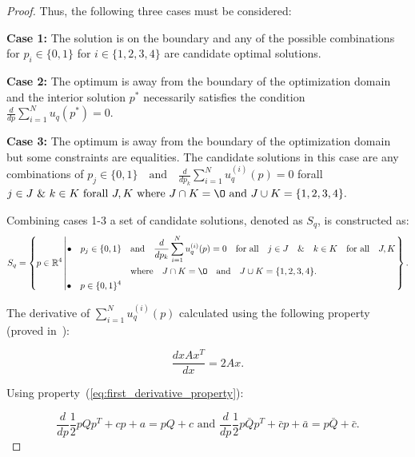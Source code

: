 \documentclass[10pt]{article}
\begin{document}
\begin{proof}
    Thus, the following three cases must be considered:
    
    \textbf{Case 1:} The solution is on the boundary and any of the possible
    combinations for $p_i \in \{0, 1\}$ for $i \in \{1, 2, 3, 4\}$ are candidate
    optimal solutions.
    
    \textbf{Case 2:} The optimum is away from the boundary of the optimization
    domain and the interior solution $p^*$ necessarily satisfies the condition
    \(\frac{d}{dp} \sum\limits_{i=1} ^ N  u_q(p^*) = 0\).
    
    \textbf{Case 3:} The optimum is away from the boundary of the optimization
    domain but some constraints are equalities. The candidate solutions in this
    case are any combinations of $p_j \in \{0, 1\} \quad \text{and} \quad
    \frac{d}{dp_k} \sum\limits_{i=1} ^ N  u_q^{(i)}(p) = 0$ forall $ j \in J
    \text{ \& } k \in K \text{ forall } J, K \text{ where } J \cap K = \O
    \text{ and } J \cup K = \{1, 2, 3, 4\}.$
    
    Combining cases 1-3 a set of candidate solutions, denoted as \(S_q\), is
    constructed as: {\scriptsize
    \begin{equation*}
        S_q =
        \left\{p \in \mathbb{R} ^ 4 \left|
            \begin{aligned}
                \bullet\quad p_j \in \{0, 1\} & \quad \text{and} \quad \frac{d}{dp_k} 
                \sum\limits_{i=1} ^ N  u_q^{(i)}(p) = 0
                \quad \text{for all} \quad j \in J \quad \&  \quad k \in K  \quad \text{for all} \quad J, K \\
                & \quad \text{where} \quad J \cap K = \O \quad
                \text{and} \quad J \cup K = \{1, 2, 3, 4\}.\\
                \bullet\quad  p \in \{0, 1\} ^ 4
            \end{aligned}\right.
        \right\}.
    \end{equation*}}

    The derivative of \(\sum\limits_{i=1} ^ N  u_q^{(i)}(p)\) calculated using
    the following property (proved in~\cite{Abadir2005}):

    \begin{equation}\label{eq:first_derivative_property}
    \frac{d x A x^T}{dx} =  2Ax.
    \end{equation}

    Using property~(\ref{eq:first_derivative_property}):

    \begin{equation}\label{eq:quadratics_derivatives}
    \frac{d}{dp} \frac{1}{2}pQp^T + cp + a = pQ + c \text{ and } \frac{d}{dp} \frac{1}{2}p\bar{Q}p^T + \bar{c}p + \bar{a} = p\bar{Q} + \bar{c}.
    \end{equation}


\end{proof}
\end{document}

